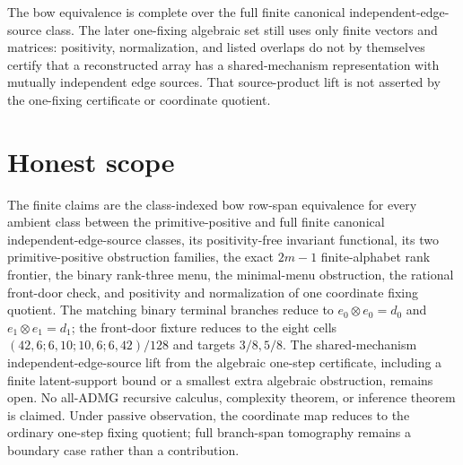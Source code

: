 \documentclass{article}
\begin{document}
The bow equivalence is complete over the full finite canonical independent-edge-source class. The later one-fixing algebraic set still uses only finite vectors and matrices: positivity, normalization, and listed overlaps do not by themselves certify that a reconstructed array has a shared-mechanism representation with mutually independent edge sources. That source-product lift is not asserted by the one-fixing certificate or coordinate quotient.

\section{Honest scope}

The finite claims are the class-indexed bow row-span equivalence for every ambient class between the primitive-positive and full finite canonical independent-edge-source classes, its positivity-free invariant functional, its two primitive-positive obstruction families, the exact \(2m-1\) finite-alphabet rank frontier, the binary rank-three menu, the minimal-menu obstruction, the rational front-door check, and positivity and normalization of one coordinate fixing quotient. The matching binary terminal branches reduce to \(e_0\otimes e_0=d_0\) and \(e_1\otimes e_1=d_1\); the front-door fixture reduces to the eight cells \((42,6;6,10;10,6;6,42)/128\) and targets \(3/8,5/8\). The shared-mechanism independent-edge-source lift from the algebraic one-step certificate, including a finite latent-support bound or a smallest extra algebraic obstruction, remains open. No all-ADMG recursive calculus, complexity theorem, or inference theorem is claimed. Under passive observation, the coordinate map reduces to the ordinary one-step fixing quotient; full branch-span tomography remains a boundary case rather than a contribution.
\end{document}

